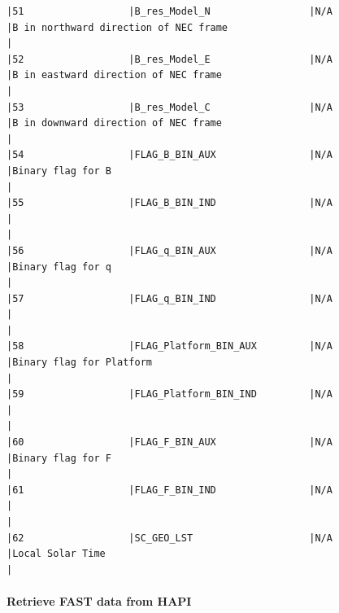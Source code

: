 \begin{verbatim}
|51                  |B_res_Model_N                 |N/A                           |B in northward direction of NEC frame                                                               |
|52                  |B_res_Model_E                 |N/A                           |B in eastward direction of NEC frame                                                                |
|53                  |B_res_Model_C                 |N/A                           |B in downward direction of NEC frame                                                                |
|54                  |FLAG_B_BIN_AUX                |N/A                           |Binary flag for B                                                                                   |
|55                  |FLAG_B_BIN_IND                |N/A                           |                                                                                                    |
|56                  |FLAG_q_BIN_AUX                |N/A                           |Binary flag for q                                                                                   |
|57                  |FLAG_q_BIN_IND                |N/A                           |                                                                                                    |
|58                  |FLAG_Platform_BIN_AUX         |N/A                           |Binary flag for Platform                                                                            |
|59                  |FLAG_Platform_BIN_IND         |N/A                           |                                                                                                    |
|60                  |FLAG_F_BIN_AUX                |N/A                           |Binary flag for F                                                                                   |
|61                  |FLAG_F_BIN_IND                |N/A                           |                                                                                                    |
|62                  |SC_GEO_LST                    |N/A                           |Local Solar Time                                                                                    |
\end{verbatim}

\paragraph{Retrieve FAST data from HAPI}

